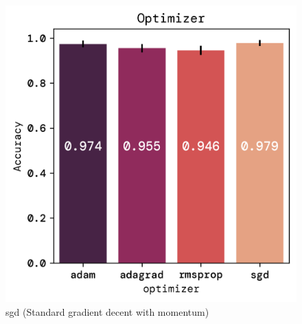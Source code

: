 \documentclass[twoside,11pt]{report}
\begin{document}
    \begin{figure}[!ht]
        \begin{minipage}[t]{0.5\textwidth - 1mm}
            \begin{center}
                \includegraphics[width=\textwidth]{../runsAndFigures/accuracy_optimizer.png}
            \end{center}
            \caption
            {
                sgd (Standard gradient decent with momentum)
            }\label{fig:accuracy_optimizer}
        \end{minipage}
        \hspace{2mm}
        \begin{minipage}[t]{0.5\textwidth - 1mm}
            \begin{center}

\end{center}
\end{minipage}
\end{figure}
\end{document}
